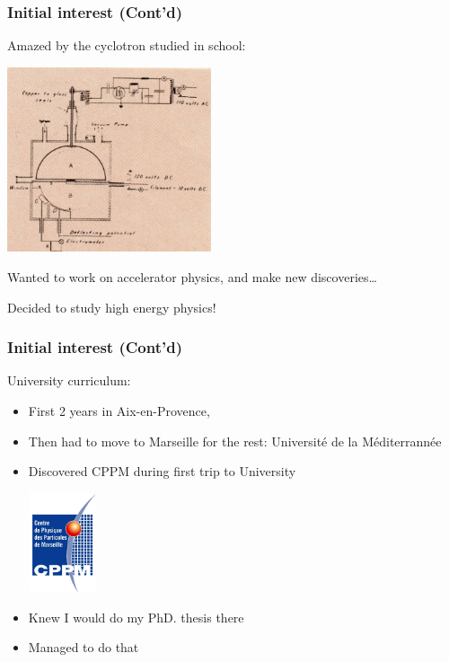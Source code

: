 \documentclass{beamer}
\begin{document}
\begin{frame}
\frametitle{Initial interest (Cont'd)}
{\color{blue}Amazed by the cyclotron} studied in school:
\begin{center}
\includegraphics[width=6cm]{firstcyclo}
\end{center}
Wanted to work on accelerator physics, and make new discoveries\ldots\\
\begin{center} 
\alert{Decided to study high energy physics!}
\end{center}
\end{frame}

\begin{frame}
\frametitle{Initial interest (Cont'd)}
University curriculum:
\begin{itemize}
  \item First 2 years in Aix-en-Provence, 
  \item Then had to {\color{blue} move to Marseille} for the rest: Universit\'e
  de la M\'editerrann\'ee
  \item {\color{blue} Discovered CPPM} during first trip to University
  \begin{center}
  \includegraphics[width=2cm]{logocppm}
  \end{center}
  \item Knew I would do my \alert{PhD. thesis there} \pause
  \item Managed to do that
\end{itemize}
\end{frame}
\end{document}
